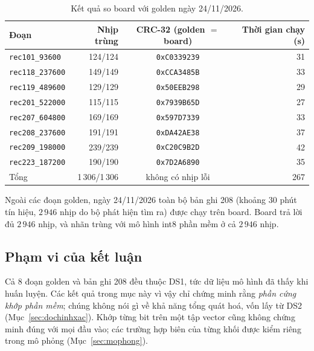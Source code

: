 \begin{table}[htbp]\centering
\caption{Kết quả so board với golden ngày 24/11/2026.}\label{tab:digest}
\small
\begin{tabular}{@{}lrcr@{}}
\toprule
Đoạn & Nhịp trùng & CRC-32 (golden $=$ board) & Thời gian chạy (s) \\ \midrule
\texttt{rec101\_93600}  & 124/124 & \texttt{0xC0339239} & 31 \\
\texttt{rec118\_237600} & 149/149 & \texttt{0xCCA3485B} & 33 \\
\texttt{rec119\_489600} & 129/129 & \texttt{0x50EEB298} & 29 \\
\texttt{rec201\_522000} & 115/115 & \texttt{0x7939B65D} & 27 \\
\texttt{rec207\_604800} & 169/169 & \texttt{0x597D7339} & 33 \\
\texttt{rec208\_237600} & 191/191 & \texttt{0xDA42AE38} & 37 \\
\texttt{rec209\_198000} & 239/239 & \texttt{0xC20C9B2D} & 42 \\
\texttt{rec223\_187200} & 190/190 & \texttt{0x7D2A6890} & 35 \\ \midrule
Tổng & 1\,306/1\,306 & không có nhịp lỗi & 267 \\ \bottomrule
\end{tabular}
\end{table}

Ngoài các đoạn golden, ngày 24/11/2026 toàn bộ bản ghi 208 (khoảng $30$ phút tín hiệu, $2\,946$ nhịp do bộ phát hiện tìm ra) được chạy trên board.
Board trả lời đủ $2\,946$ nhịp, và nhãn trùng với mô hình int8 phần mềm ở cả $2\,946$ nhịp.

\subsection{Phạm vi của kết luận}
Cả $8$ đoạn golden và bản ghi 208 đều thuộc DS1, tức dữ liệu mô hình đã thấy khi huấn luyện.
Các kết quả trong mục này vì vậy chỉ chứng minh rằng \emph{phần cứng khớp phần mềm}; chúng không nói gì về khả năng tổng quát hoá, vốn lấy từ DS2 (Mục~\ref{sec:dochinhxac}).
Khớp từng bit trên một tập vector cũng không chứng minh đúng với mọi đầu vào; các trường hợp biên của từng khối được kiểm riêng trong mô phỏng (Mục~\ref{sec:mophong}).
